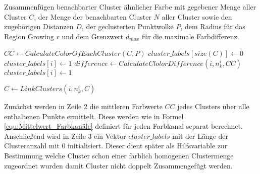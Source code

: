 \begin{algorithm}
	\caption{Zusammenfügen benachbarter Cluster ähnlicher Farbe mit gegebener Menge aller Cluster $C$, der Menge der benachbarten Cluster $N$ aller Cluster sowie den zugehörigen Distanzen $D$, der geclusterten Punktwolke $P$, dem Radius für das Region Growing $r$ und dem Grenzwert $d_{max}$ für die maximale Farbdifferenz.}
	\label{alg:MergeRegions}
	\begin{algorithmic}[1]
			\State $ CC \leftarrow CalculateColorOfEachCluster(C,P)$
			\State $ cluster\_labels[size(C)] \leftarrow 0 $
					\State $ cluster\_labels[i] \leftarrow 1 $
				\EndIf
							\State $ difference \leftarrow CalculateClolorDifference(i,n_k^i,CC) $
								\State $ cluster\_labels[i] \leftarrow 1 $
								
								\State $ C \leftarrow LinkClusters(i,n_k^i,C) $
							\EndIf
						\EndIf  
					\EndIf
				\EndFor
			\EndFor	
			\State {}
		\EndFunction
	\end{algorithmic}
\end{algorithm}

Zunächst werden in Zeile 2 die mittleren Farbwerte $CC$ jedes Clusters über alle enthaltenen Punkte ermittelt. Diese werden wie in Formel \ref{equ:Mittelwert_Farbkanäle} definiert für jeden Farbkanal separat berechnet. Anschließend wird in Zeile 3 ein Vektor $cluster\_labels$ mit der Länge der Clusteranzahl mit $0$ initialisiert. Dieser dient später als  Hilfsvariable zur Bestimmung welche Cluster schon einer farblich homogenen Clustermenge zugeordnet wurden damit Cluster nicht doppelt Zusammengefügt werden. 

